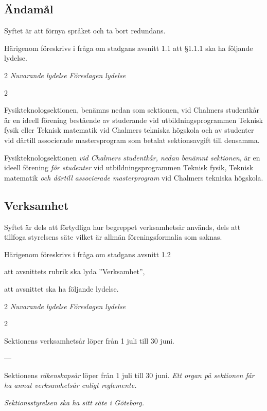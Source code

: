 \documentclass{article}
\newenvironment{lydelse}
    {\begin{paracol}{2}%
        \emph{Nuvarande lydelse}%
        \switchcolumn%
        \emph{Föreslagen lydelse}%
    \end{paracol}%
    \begin{enumerate}[label=\thesubsection.\arabic*]%
    \begin{paracol}{2}%
    }{\end{paracol}\end{enumerate}}
\begin{document}
\subsection{Ändamål}
Syftet är att förnya språket och ta bort redundans.

Härigenom föreskrivs i fråga om stadgans avsnitt 1.1 att \S 1.1.1 ska ha följande lydelse.

\begin{lydelse}
    \item Fysikteknologsektionen, benämns nedan som sektionen, vid Chalmers studentkår är en ideell förening bestående av studerande vid utbildningsprogrammen Teknisk fysik eller Teknisk matematik vid Chalmers tekniska högskola och av studenter vid därtill associerade mastersprogram som betalat sektionsavgift till densamma.
  \switchcolumn
    \item Fysikteknologsektionen \emph{vid Chalmers studentkår, nedan benämnt sektionen}, är en ideell förening \emph{för studenter} vid utbildningsprogrammen Teknisk fysik, Teknisk matematik \emph{och därtill associerade masterprogram} vid Chalmers tekniska högskola.
\end{lydelse}

\subsection{Verksamhet}
Syftet är dels att förtydliga hur begreppet verksamhetsår används, dels att tillfoga styrelsens säte vilket är allmän föreningsformalia som saknas.

Härigenom föreskrivs i fråga om stadgans avsnitt 1.2
\begin{dels}
    \item att avsnittets rubrik ska lyda ''Verksamhet'',
    \item att avsnittet ska ha följande lydelse.
\end{dels}

\begin{lydelse}
    \item Sektionens verksamhetsår löper från 1 juli till 30 juni.
    \item[] ---
  \switchcolumn
    \item Sektionens \emph{räkenskapsår} löper från 1 juli till 30 juni. \emph{Ett organ på sektionen får ha annat verksamhetsår enligt reglemente.}
    \label{S:Verksamhetsar}
    \item \emph{Sektionsstyrelsen ska ha sitt säte i Göteborg.}
\end{lydelse}
\end{document}
